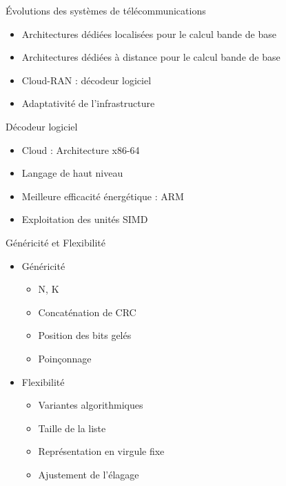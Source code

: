 \documentclass[t,compress,mathserif,12pt,xcolor=dvipsnames]{beamer}
\begin{document}
\begin{frame}[c]{\'Evolutions des systèmes de télécommunications}
	\begin{itemize}
		\item<1-> Architectures dédiées localisées pour le calcul bande de base
		\item<2-> Architectures dédiées à distance pour le calcul bande de base
		\item<3-> Cloud-RAN : décodeur logiciel
		\item<4-> Adaptativité de l'infrastructure
	\end{itemize}
\end{frame}

\begin{frame}[c]{Décodeur logiciel}
	\begin{itemize}
		\vfill
		\item Cloud : Architecture x86-64
		\vfill
		\item Langage de haut niveau
		\vfill
		\item Meilleure efficacité énergétique : ARM
		\vfill
		\item Exploitation des unités SIMD
		\vfill
	\end{itemize}
\end{frame}

\begin{frame}[c]{Généricité et Flexibilité}
	\begin{itemize}
		\item Généricité
		\begin{itemize}
			\item N, K
			\item Concaténation de CRC
			\item Position des bits gelés
			\item Poinçonnage
		\end{itemize}
		\item Flexibilité
		\begin{itemize}
			\item Variantes algorithmiques
			\item Taille de la liste
			\item Représentation en virgule fixe
			\item Ajustement de l'élagage
		\end{itemize}
	\end{itemize}
\end{frame}
\end{document}
